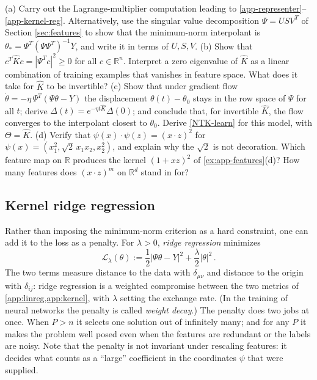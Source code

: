 \documentclass[11pt]{article}
\newcommand{\R}{\mathbb{R}}
\newcommand{\CL}{{\mathcal L}}
\begin{document}
\begin{exercise}
\label{ex:app-kernel}
(a) Carry out the Lagrange-multiplier computation leading to \eqref{app-representer}--\eqref{app-kernel-reg}. Alternatively, use the singular value decomposition $\Psi = USV^T$ of Section \ref{sec:features} to show that the minimum-norm interpolant is $\theta_* = \Psi^T(\Psi\Psi^T)^{-1}Y$, and write it in terms of $U,S,V$.
(b) Show that $c^T\hat Kc = |\Psi^Tc|^2\geq 0$ for all $c\in\R^n$. Interpret a zero eigenvalue of $\hat K$ as a linear combination of training examples that vanishes in feature space. What does it take for $\hat K$ to be invertible?
(c) Show that under gradient flow $\dot\theta = -\eta\,\Psi^T(\Psi\theta - Y)$ the displacement $\theta(t)-\theta_0$ stays in the row space of $\Psi$ for all $t$; derive $\Delta(t) = e^{-\eta t\hat K}\Delta(0)$; and conclude that, for invertible $\hat K$, the flow converges to the interpolant closest to $\theta_0$. Derive \eqref{NTK-learn} for this model, with $\Theta = \hat K$.
(d) Verify that $\psi(x)\cdot\psi(z) = (x\cdot z)^2$ for $\psi(x) = (x_1^2,\sqrt2\,x_1x_2,x_2^2)$, and explain why the $\sqrt2$ is not decoration. Which feature map on $\R$ produces the kernel $(1+xz)^2$ of \cref{ex:app-features}(d)? How many features does $(x\cdot z)^m$ on $\R^d$ stand in for?
\end{exercise}

\subsection{Kernel ridge regression}
\label{app:ridge}

Rather than imposing the minimum-norm criterion as a hard constraint, one can add it to the loss as a penalty. For $\lambda>0$, \emph{ridge regression} minimizes
%
\begin{equation}
    \CL_\lambda(\theta) := \frac{1}{2}|\Psi\theta - Y|^2 + \frac{\lambda}{2}|\theta|^2\,. \label{app-ridge-loss}
\end{equation}
%
The two terms measure distance to the data with $\delta_{\mu\nu}$ and distance to the origin with $\delta_{ij}$: ridge regression is a weighted compromise between the two metrics of \cref{app:linreg,app:kernel}, with $\lambda$ setting the exchange rate. (In the training of neural networks the penalty is called \emph{weight decay}.) The penalty does two jobs at once. When $P>n$ it selects one solution out of infinitely many; and for any $P$ it makes the problem well posed even when the features are redundant or the labels are noisy. Note that the penalty is not invariant under rescaling features: it decides what counts as a ``large'' coefficient in the coordinates $\psi$ that were supplied.
\end{document}
